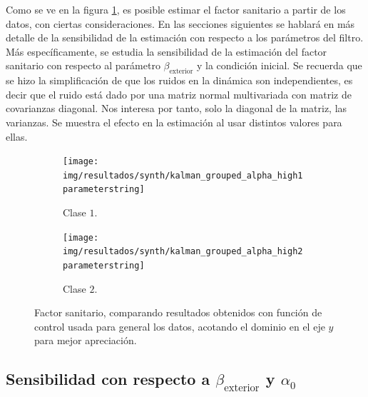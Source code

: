 Como se ve en la figura \ref{synth-alpha-comp-high}, es posible estimar el factor sanitario a partir de los datos, con ciertas consideraciones. En las secciones siguientes  se hablará en más detalle de la sensibilidad de la estimación con respecto a los parámetros del filtro. Más específicamente, se estudia la sensibilidad de la estimación del factor sanitario con respecto al parámetro \(\beta_{\text{exterior}}\) y la condición inicial. Se recuerda que se hizo la simplificación de que los ruidos en la dinámica son independientes, es decir que el ruido está dado por una matriz normal multivariada con matriz de covarianzas diagonal. Nos interesa por tanto, solo la diagonal de la matriz, las varianzas. Se muestra el efecto en la estimación al usar distintos valores para ellas.

\begin{figure}[!h]
     \centering
     \begin{subfigure}[b]{\textwidth}
         \centering
         \texttt{[image: img/resultados/synth/kalman\_grouped\_alpha\_high1\\parameterstring]}
         \caption{Clase \(1\).}
     \end{subfigure}
     \hfill
     \begin{subfigure}[b]{\textwidth}
         \centering
         \texttt{[image: img/resultados/synth/kalman\_grouped\_alpha\_high2\\parameterstring]}
         \caption{Clase \(2\).}
     \end{subfigure}
        \caption[Factor sanitario, caso sintético]{Factor sanitario, comparando resultados obtenidos con función de control usada para general los datos, acotando el dominio en el eje \(y\) para mejor apreciación.}
        \label{synth-alpha-comp-high}
\end{figure}


\subsection{Sensibilidad con respecto a \(\beta_{\text{exterior}}\) y \(\alpha_0\)} \label{subsec:sensibeta}

